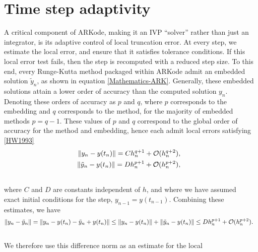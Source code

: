 \documentclass[letterpaper,10pt,english]{sphinxmanual}
\begin{document}
\section{Time step adaptivity}
\label{Mathematics:time-step-adaptivity}\label{Mathematics:mathematics-adaptivity}
A critical component of ARKode, making it an IVP ``solver'' rather than
just an integrator, is its adaptive control of local truncation error.
At every step, we estimate the local error, and ensure that it
satisfies tolerance conditions.  If this local error test fails, then
the step is recomputed with a reduced step size.  To this end, every
Runge-Kutta method packaged within ARKode admit an embedded solution
$\tilde{y}_n$, as shown in equation \eqref{Mathematics-ARK}. Generally, these
embedded solutions attain a lower order of accuracy than the computed
solution $y_n$.  Denoting these orders of accuracy as $p$
and $q$, where $p$ corresponds to the embedding and
$q$ corresponds to the method, for the majority of embedded
methods $p = q-1$.  These values of $p$ and $q$
correspond to the global order of accuracy for the method and
embedding, hence each admit local errors satisfying {\hyperref[References:hw1993]{{[}HW1993{]}}}
\label{Mathematics:equation-AsymptoticErrors}\begin{gather}
\begin{split}\| y_n - y(t_n) \| = C h_n^{q+1} + \mathcal O(h_n^{q+2}), \\
\| \tilde{y}_n - y(t_n) \| = D h_n^{p+1} + \mathcal O(h_n^{p+2}),\end{split}\label{Mathematics-AsymptoticErrors}\\\begin{split}\end{split}\notag
\end{gather}
where $C$ and $D$ are constants independent of $h$,
and where we have assumed exact initial conditions for the step,
$y_{n-1} = y(t_{n-1})$. Combining these estimates, we have
\begin{gather}
\begin{split}\| y_n - \tilde{y}_n \| = \| y_n - y(t_n) - \tilde{y}_n + y(t_n) \|
\le \| y_n - y(t_n) \| + \| \tilde{y}_n - y(t_n) \|
\le D h_n^{p+1} + \mathcal O(h_n^{p+2}).\end{split}\notag\\\begin{split}\end{split}\notag
\end{gather}
We therefore use this difference norm as an estimate for the local
\end{document}
